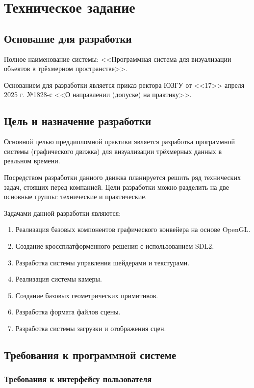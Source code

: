 \section{Техническое задание}
\subsection{Основание для разработки}

Полное наименование системы: <<Программная система для визуализации объектов в трёхмерном пространстве>>.

Основанием для разработки является приказ ректора ЮЗГУ от <<17>> апреля 2025 г. №1828-с <<О направлении (допуске) на практику>>.

\subsection{Цель и назначение разработки}

Основной целью преддипломной практики является разработка программной системы (графического движка) для визуализации трёхмерных данных в реальном времени.

Посредством разработки данного движка планируется решить ряд технических задач, стоящих перед компанией. Цели разработки можно разделить на две основные группы: технические и практические.

Задачами данной разработки являются:

\begin{enumerate}
    \item Реализация базовых компонентов графического конвейера на основе OpenGL.
    \item Создание кроссплатформенного решения с использованием SDL2.
    \item Разработка системы управления шейдерами и текстурами.
    \item Реализация системы камеры.
    \item Создание базовых геометрических примитивов.
    \item Разработка формата файлов сцены.
    \item Разработка системы загрузки и отображения сцен.
\end{enumerate}

\subsection{Требования к программной системе}

\subsubsection{Требования к интерфейсу пользователя}

